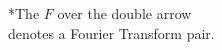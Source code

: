 \documentclass[preview]{standalone}
\begin{document}
\begin{center}
*The $F$ over the double arrow \\ denotes a Fourier Transform pair.
\end{center}
\end{document}
